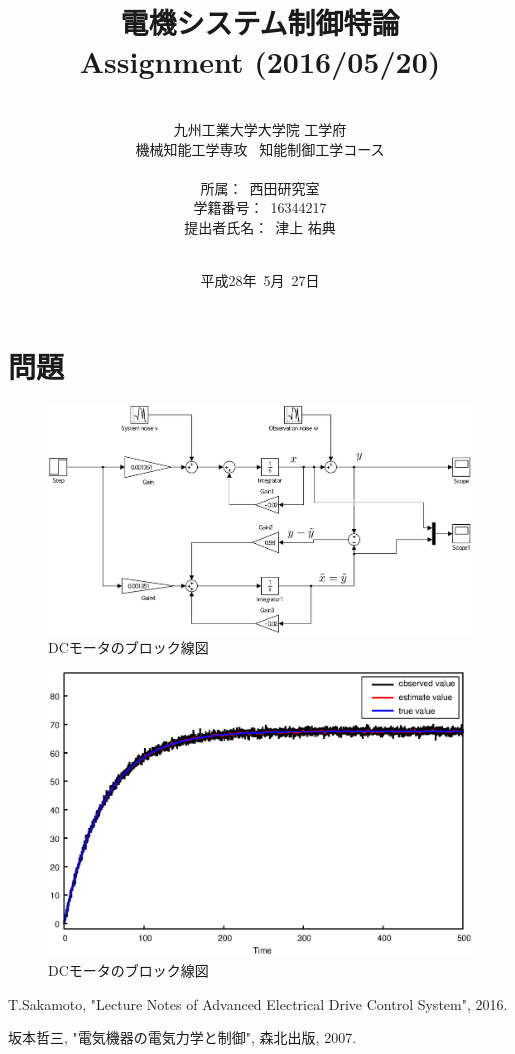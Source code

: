 \documentclass[a4paper,12pt]{jarticle}
\title{電機システム制御特論 \\
Assignment (2016/05/20)\\
}
\author{\vspace{40mm}\\
九州工業大学大学院 \hspace{0mm} 工学府\\
機械知能工学専攻\ \hspace{0mm} 知能制御工学コース \\
\vspace{5mm}\\
所属：\ 西田研究室\\
学籍番号：\ 16344217\\
提出者氏名：\ 津上 \hspace{0mm} 祐典\\\vspace{5mm}\\ }
\date{平成28年\ 5月\ 27日}
\begin{document}
\titlepage
\maketitle
\thispagestyle{empty}

\newpage

\thispagestyle{empty}
\tableofcontents

\newpage
\setcounter{page}{1}
\section{問題}
%
\begin{figure}[bp]
 \begin{center}
  \includegraphics[width = 150mm]{fig/kalmanfilter.eps}
 \end{center}
 \caption{DCモータのブロック線図}
 \label{fig:DC_model}
\end{figure}
%
\begin{figure}[bp]
 \begin{center}
  \includegraphics[width = 150mm]{fig/kalmanfilterG.eps}
 \end{center}
 \caption{DCモータのブロック線図}
 \label{fig:DC}
\end{figure}

%
\begin{thebibliography}{99}

  T.Sakamoto,
		 "Lecture Notes of Advanced Electrical Drive Control System", 2016.

  坂本哲三, "電気機器の電気力学と制御", 森北出版, 2007.

\end{thebibliography}
\end{document}
